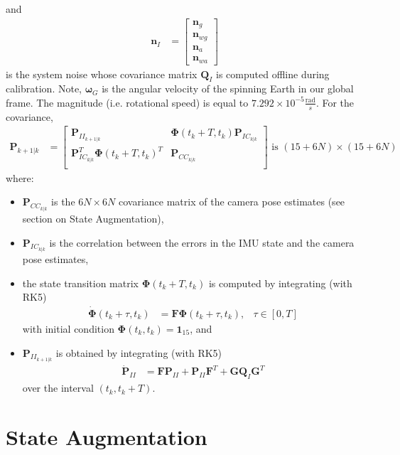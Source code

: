 \documentclass[10pt,letterpaper,fleqn,oneside]{article}
\newcommand{\nl}{\\[0.5em]}
\def\Vec#1{\mathbf{#1}} %
\newcommand{\bbm}{\begin{bmatrix}}
\newcommand{\ebm}{\end{bmatrix}}
\begin{document}
and
\begin{align}
\Vec{n}_I &= \bbm \Vec{n}_g \nl \Vec{n}_{wg} \nl \Vec{n}_a \nl \Vec{n}_{wa} \ebm
\end{align}
is the system noise whose covariance matrix $\Vec{Q}_I$ is computed offline during calibration. Note, $\pmb{\omega}_G$ is the angular velocity of the spinning Earth in our global frame. The magnitude (i.e. rotational speed) is equal to $7.292 \times 10^{−5} \frac{\text{rad}}{s}$. 
\newpage\noindent
For the covariance,
\begin{align}
\Vec{P}_{k+1 | k} &= \bbm	\Vec{P}_{II_{k+1|k}} & \boldsymbol{\Phi}\left(t_k + T, t_k\right)\Vec{P}_{IC_{k|k}}\nl
											\Vec{P}_{IC_{k|k}}^T\boldsymbol{\Phi}\left(t_k + T, t_k\right)^T & \Vec{P}_{CC_{k|k}}\nl
								\ebm \text{ is }\left(15 + 6N\right)\times\left(15 + 6N\right)
\end{align}
where:
\begin{itemize}
\item $\Vec{P}_{CC_{k|k}}$ is the $6N\times6N$ covariance matrix of the camera pose estimates (see section on State Augmentation), 
\item $\Vec{P}_{IC_{k|k}}$ is the correlation between the errors in the IMU state and the camera pose estimates,
\item the state transition matrix $\boldsymbol{\Phi}\left(t_k + T, t_k\right)$ is computed by integrating (with RK5)
\begin{align}
\dot{\boldsymbol{\Phi}}\left(t_k + \tau, t_k\right) &= \Vec{F}\boldsymbol{\Phi}\left(t_k + \tau, t_k\right), &\tau\in\left[0,T\right]
\end{align}
with initial condition $\boldsymbol{\Phi}\left(t_k, t_k\right) = \Vec{1}_{15}$, and
\item $\Vec{P}_{II_{k+1|k}}$ is obtained by integrating (with RK5)
\begin{align}
\dot{\Vec{P}}_{II} &= \Vec{F}\Vec{P}_{II} + \Vec{P}_{II}\Vec{F}^T + \Vec{G}\Vec{Q}_I\Vec{G}^T
\end{align}
over the interval $\left(t_k, t_k+T\right)$.
\end{itemize}

\section{State Augmentation}
\end{document}
